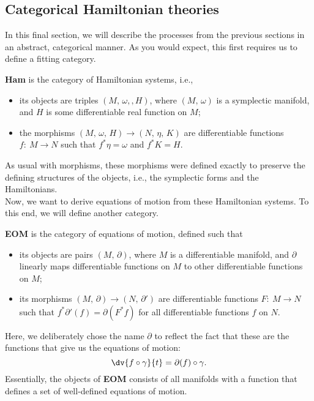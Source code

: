 \documentclass{article}
\newcommand{\category}[1]{{\normalfont\textbf{#1}}}
\begin{document}
\begin{multicols}{2}
	\section{Categorical Hamiltonian theories}
	In this final section, we will describe the processes from the previous sections in an abstract, categorical manner. As you would expect, this first requires us to define a fitting category.
	\begin{definition}
		\category{Ham} is the category of Hamiltonian systems, i.e.,
		\begin{itemize}
			\item its objects are triples \((M,\,\omega,
			,H)\), where \((M,\,\omega)\) is a symplectic manifold, and \(H\) is some differentiable real function on \(M\);
			\item the morphisms \((M,\,\omega,\,H) \to (N,\,\eta,\,K)\) are differentiable functions \(f:\ M\to N\) such that \(f^*\eta = \omega\) and \(f^*K = H\).
		\end{itemize}
	\end{definition}
	As usual with morphisms, these morphisms were defined exactly to preserve the defining structures of the objects, i.e., the symplectic forms and the Hamiltonians.\\
	Now, we want to derive equations of motion from these Hamiltonian systems. To this end, we will define another category.
	\begin{definition}
		\category{EOM} is the category of equations of motion, defined such that
		\begin{itemize}
			\item its objects are pairs \((M,\,\partial)\), where \(M\) is a differentiable manifold, and \(\partial\) linearly maps differentiable functions on \(M\) to other differentiable functions on \(M\);
			\item its morphisms \((M,\,\partial) \to (N,\,\partial')\) are differentiable functions \(F:\ M\to N\) such that \(f^*\partial'(f) = \partial(F^*f)\) for all differentiable functions \(f\) on \(N\).
		\end{itemize}
	\end{definition}
	Here, we deliberately chose the name \(\partial\) to reflect the fact that these are the functions that give us the equations of motion:
	\begin{equation}
		\dv{f\circ\gamma}{t} = \partial(f)\circ\gamma.
	\end{equation}
	Essentially, the objects of \category{EOM} consists of all manifolds with a function that defines a set of well-defined equations of motion.
\end{multicols}
\end{document}
